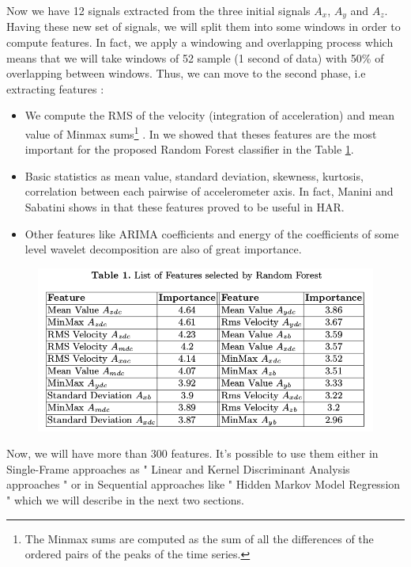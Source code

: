 \documentclass[11pt,a4paper,oneside]{article}
\begin{document}
Now we have 12 signals extracted from the three initial signals $A_x$, $A_y$ and $A_z$. Having these new set of signals, we will split them into some windows in order to compute features. In fact, we apply a windowing and overlapping process which means that we will take windows of 52 sample (1 second of data) with 50\% of overlapping between windows. Thus, we can move to the second phase, i.e extracting features :

\begin{itemize}
\item  We compute the RMS of the velocity (integration of acceleration) and mean value of Minmax sums\footnote{The Minmax sums are computed as the sum of all the differences of the ordered pairs of the peaks of the time series.\cite{casale}}  . In \cite{casale} we showed that theses features are the most important for the proposed Random Forest classifier in the Table \ref{fig-table}.

\item Basic statistics as mean value, standard deviation, skewness, kurtosis, correlation between each pairwise of accelerometer axis. In fact, Manini and Sabatini shows in \cite{mannini} that  these features proved to be useful in HAR.

\item Other features like ARIMA coefficients \cite{mannini} and energy of the coefficients of some level wavelet decomposition \cite{casale} are also of great importance.
\end{itemize}

\begin{figure}[ht!]
\begin{center}
\includegraphics[scale=.5]{table}
\label{fig-table}
\end{center}
\end{figure}
Now, we will have more than 300 features. It's possible to use them either in Single-Frame approaches as " Linear and Kernel Discriminant Analysis approaches " or in Sequential approaches like " Hidden Markov Model Regression " which we will describe in the next two sections. 
\end{document}
